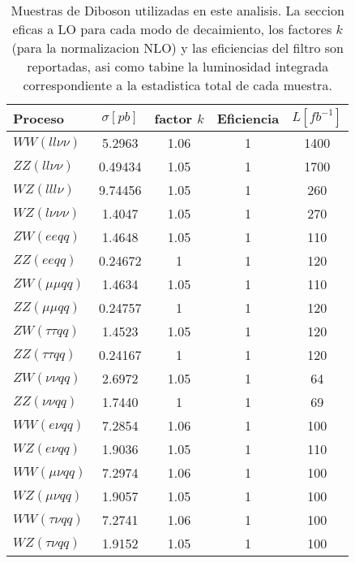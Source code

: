 \begin{table}[ht!]
  \centering
  \caption{Muestras de Diboson utilizadas en este analisis.
    La seccion eficas a LO para cada modo de decaimiento, los factores $k$
    (para la normalizacion NLO) y las eficiencias del filtro son reportadas,
    asi como tabine la luminosidad integrada correspondiente a la estadistica
    total de cada muestra.}

  \begin{tabular}{ l | c | c | c | c }
    \hline
    \hline
    Proceso & $\sigma [pb]$ & factor $k$ & Eficiencia & $L [fb^{-1}]$ \\
    \hline
    $WW(ll\nu\nu)$       & 5.2963  & 1.06 & 1 & 1400 \\
    $ZZ(ll\nu\nu)$       & 0.49434 & 1.05 & 1 & 1700 \\
    $WZ(lll\nu)$         & 9.74456 & 1.05 & 1 & 260 \\
    $WZ(l\nu\nu\nu)$     & 1.4047  & 1.05 & 1 & 270 \\
    $ZW(eeqq)$           & 1.4648  & 1.05 & 1 & 110 \\
    $ZZ(eeqq)$           & 0.24672 & 1    & 1 & 120 \\
    $ZW(\mu\mu qq)$      & 1.4634  & 1.05 & 1 & 110 \\
    $ZZ(\mu\mu qq)$      & 0.24757 & 1    & 1 & 120 \\
    $ZW(\tau\tau qq)$    & 1.4523  & 1.05 & 1 & 120 \\
    $ZZ(\tau\tau qq)$    & 0.24167 & 1    & 1 & 120 \\
    $ZW(\nu\nu qq)$      & 2.6972  & 1.05 & 1 & 64 \\
    $ZZ(\nu\nu qq)$      & 1.7440  & 1    & 1 & 69 \\
    $WW(e\nu qq)$        & 7.2854  & 1.06 & 1 & 100 \\
    $WZ(e\nu qq)$        & 1.9036  & 1.05 & 1 & 110 \\
    $WW(\mu\nu qq)$      & 7.2974  & 1.06 & 1 & 100 \\
    $WZ(\mu\nu qq)$      & 1.9057  & 1.05 & 1 & 100 \\
    $WW(\tau\nu qq)$     & 7.2741  & 1.06 & 1 & 100 \\
    $WZ(\tau\nu qq)$     & 1.9152  & 1.05 & 1 & 100 \\
    \hline
    \hline
  \end{tabular}
  \label{tab:bkg_diboson_samples}
 \end{table}
